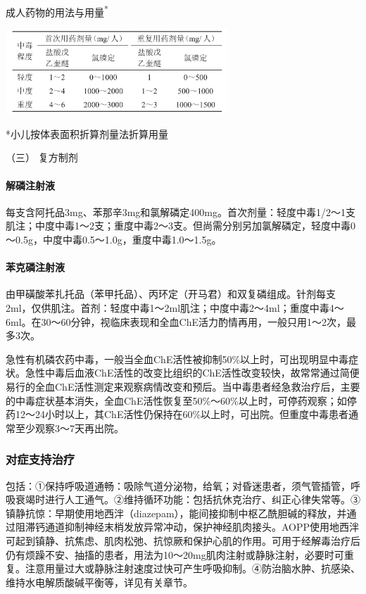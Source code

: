 \begin{table}[htbp]
\centering
\caption{成人药物的用法与用量\textsuperscript{*}}
\label{tab55-8}
\includegraphics[width=3.29167in,height=1.26042in]{./images/Image00210.jpg}
\end{table}

*小儿按体表面积折算剂量法折算用量

\hypertarget{text00139.htmlux5cux23CHP5-3-1-3-2-3}{}
（三） 复方制剂

\paragraph{解磷注射液}

每支含阿托品3mg、苯那辛3mg和氯解磷定400mg。首次剂量：轻度中毒1/2～1支肌注；中度中毒1～2支；重度中毒2～3支。但尚需分别另加氯解磷定，轻度中毒0～0.5g，中度中毒0.5～1.0g，重度中毒1.0～1.5g。

\paragraph{苯克磷注射液}

由甲磺酸苯扎托品（苯甲托品）、丙环定（开马君）和双复磷组成。针剂每支2ml，仅供肌注。首剂：轻度中毒1～2ml肌注；中度中毒2～4ml；重度中毒4～6ml。在30～60分钟，视临床表现和全血ChE活力酌情再用，一般只用1～2次，最多3次。

急性有机磷农药中毒，一般当全血ChE活性被抑制50\%以上时，可出现明显中毒症状。急性中毒后血液ChE活性的改变比组织的ChE活性改变较快，故常常通过简便易行的全血ChE活性测定来观察病情改变和预后。当中毒患者经急救治疗后，主要的中毒症状基本消失，全血ChE活性恢复至50\%～60\%以上时，可停药观察；如停药12～24小时以上，其ChE活性仍保持在60\%以上时，可出院。但重度中毒患者通常至少观察3～7天再出院。

\subsubsection{对症支持治疗}

包括：①保持呼吸道通畅：吸除气道分泌物，给氧；对昏迷患者，须气管插管，呼吸衰竭时进行人工通气。②维持循环功能：包括抗休克治疗、纠正心律失常等。③镇静抗惊：早期使用地西泮（diazepam），能间接抑制中枢乙酰胆碱的释放，并通过阻滞钙通道抑制神经末梢发放异常冲动，保护神经肌肉接头。AOPP使用地西泮可起到镇静、抗焦虑、肌肉松弛、抗惊厥和保护心肌的作用。可用于经解毒治疗后仍有烦躁不安、抽搐的患者，用法为10～20mg肌肉注射或静脉注射，必要时可重复。注意用量过大或静脉注射速度过快可产生呼吸抑制。④防治脑水肿、抗感染、维持水电解质酸碱平衡等，详见有关章节。

